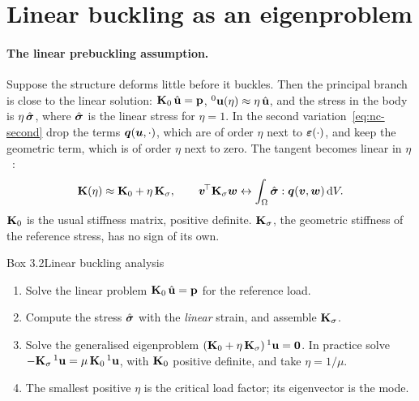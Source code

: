 \section{Linear buckling as an eigenproblem}\label{sec:nc-lba}
%

\paragraph{The linear prebuckling assumption.}
Suppose the structure deforms little before it buckles. Then the principal branch is
close to the linear solution: $\mathbf{K}_0\,\hat{\mathbf{u}} = \mathbf{p}$, ${}^0\mathbf{u}(\eta) \approx \eta\,\hat{\mathbf{u}}$,
and the stress in the body is $\eta\,\hat{\bm{\sigma}}$, where $\hat{\bm{\sigma}}$ is the linear stress for
$\eta = 1$. In the second variation~\eqref{eq:nc-second} drop the terms
$\bm{q}(\bm{u},\cdot)$, which are of order $\eta$ next to $\bm{\varepsilon}(\cdot)$, and keep the
geometric term, which is of order $\eta$ next to zero. The tangent becomes linear in
$\eta$~\cite[slide~9]{nc-triantafyllidis2018}:
\begin{equation}\label{eq:nc-lba-K}
  \mathbf{K}(\eta) \approx \mathbf{K}_0 + \eta\,\mathbf{K}_\sigma,
  \qquad
  \bm{v}^{\!\top}\mathbf{K}_\sigma\bm{w} \leftrightarrow \int_\Omega \hat{\bm{\sigma}} : \bm{q}(\bm{v},\bm{w})\,\mathrm{d} V .
\end{equation}
$\mathbf{K}_0$ is the usual stiffness matrix, positive definite. $\mathbf{K}_\sigma$, the geometric
stiffness of the reference stress, has no sign of its own.

\begin{gbox}{Box 3.2\quad Linear buckling analysis}\label{sec:nc-box-lba}
%
\begin{enumerate}
  \item Solve the linear problem $\mathbf{K}_0\,\hat{\mathbf{u}} = \mathbf{p}$ for the reference load.
  \item Compute the stress $\hat{\bm{\sigma}}$ with the \emph{linear} strain, and assemble $\mathbf{K}_\sigma$.
  \item Solve the generalised eigenproblem $(\mathbf{K}_0 + \eta\,\mathbf{K}_\sigma)\,{}^1\mathbf{u} = \mathbf{0}$.
        In practice solve $-\mathbf{K}_\sigma\,{}^1\mathbf{u} = \mu\,\mathbf{K}_0\,{}^1\mathbf{u}$, with
        $\mathbf{K}_0$ positive definite, and take $\eta = 1/\mu$.
  \item The smallest positive $\eta$ is the critical load factor; its eigenvector is the mode.
\end{enumerate}
\end{gbox}

